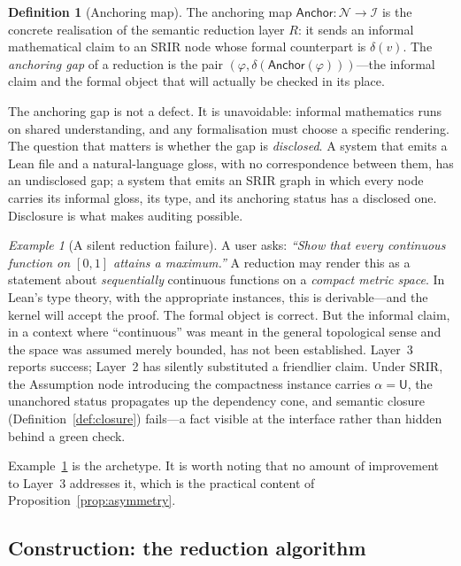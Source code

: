 \documentclass[11pt,a4paper]{article}
\theoremstyle{definition}
\newtheorem{definition}{Definition}[section]
\theoremstyle{plain}
\theoremstyle{remark}
\newtheorem{example}{Example}[section]
\newcommand{\NL}{\mathcal{N}}          %
\newcommand{\IR}{\mathcal{I}}          %
\newcommand{\Anch}{\mathsf{Anchor}}
\begin{document}
\begin{definition}[Anchoring map]
\label{def:anchormap}
The anchoring map $\Anch : \NL \to \IR$ is the concrete realisation of the
semantic reduction layer $R$: it sends an informal mathematical claim to an
SRIR node whose formal counterpart is $\delta(v)$. The \emph{anchoring gap} of
a reduction is the pair $(\varphi, \delta(\Anch(\varphi)))$---the informal claim
and the formal object that will actually be checked in its place.
\end{definition}

The anchoring gap is not a defect. It is unavoidable: informal mathematics runs
on shared understanding, and any formalisation must choose a specific rendering.
The question that matters is whether the gap is \emph{disclosed}. A system that
emits a Lean file and a natural-language gloss, with no correspondence between
them, has an undisclosed gap; a system that emits an SRIR graph in which every
node carries its informal gloss, its type, and its anchoring status has a
disclosed one. Disclosure is what makes auditing possible.

\begin{example}[A silent reduction failure]
\label{ex:silent}
A user asks: \emph{``Show that every continuous function on $[0,1]$ attains a
maximum.''} A reduction may render this as a statement about
\emph{sequentially} continuous functions on a \emph{compact metric space}. In
Lean's type theory, with the appropriate instances, this is derivable---and the
kernel will accept the proof. The formal object is correct. But the informal
claim, in a context where ``continuous'' was meant in the general topological
sense and the space was assumed merely bounded, has not been established.
Layer~3 reports success; Layer~2 has silently substituted a friendlier claim.
Under SRIR, the \textsf{Assumption} node introducing the compactness instance
carries $\alpha = \mathsf{U}$, the unanchored status propagates up the
dependency cone, and semantic closure (Definition~\ref{def:closure}) fails---a
fact visible at the interface rather than hidden behind a green check.
\end{example}

Example~\ref{ex:silent} is the archetype. It is worth noting that no amount of
improvement to Layer~3 addresses it, which is the practical content of
Proposition~\ref{prop:asymmetry}.

\subsection{Construction: the reduction algorithm}
\end{document}
